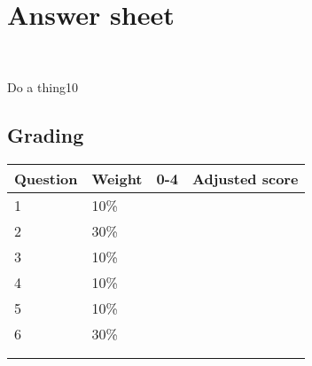 \documentclass[a4paper,12pt]{book}
\begin{document}

    \newpage{}
    \section*{Answer sheet}

    ~\\
    \begin{answersheetquestion}{1}{Do a thing}{10}
        \iftoggle{answerkey}{ \begin{answer}
            Here's the answer
        \end{answer} }{ ~\\ \raisebox{0pt}[4cm][0pt]{  } }
    \end{answersheetquestion}
        
    \hrulefill{}
    \subsection*{Grading}
    
    \begin{center}
        
        \begin{tabular}{ | l | l | l | l | }
            \hline
            \textbf{ Question } & \textbf{ Weight } & \textbf{ 0-4 } & \textbf{ Adjusted score }
            \\ \hline{}
            
            1 & 10\% & &    \\ \hline
            2 & 30\% & &    \\ \hline
            3 & 10\% & &    \\ \hline
            4 & 10\% & &    \\ \hline
            5 & 10\% & &    \\ \hline
            6 & 30\% & &    \\ \hline
            & & & \\ \hline
            & & & \\ \hline
            
            
        \end{tabular}
    \end{center}
    
\end{document}
